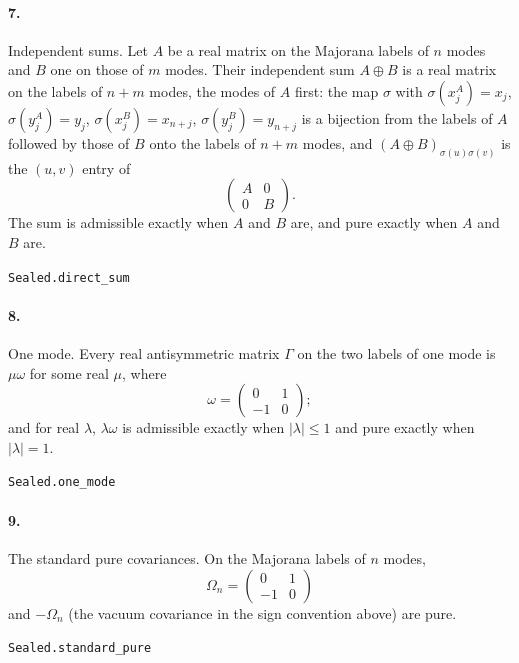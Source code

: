 \documentclass[11pt]{article}
\begin{document}
\paragraph{7.} Independent sums. Let $A$ be a real matrix on the Majorana labels of $n$ modes and $B$ one on those of $m$ modes. Their independent sum $A \oplus B$ is a real matrix on the labels of $n + m$ modes, the modes of $A$ first: the map $\sigma$ with $\sigma(x_j^A) = x_j$, $\sigma(y_j^A) = y_j$, $\sigma(x_j^B) = x_{n+j}$, $\sigma(y_j^B) = y_{n+j}$ is a bijection from the labels of $A$ followed by those of $B$ onto the labels of $n + m$ modes, and $(A \oplus B)_{\sigma(u) \sigma(v)}$ is the $(u, v)$ entry of \[\begin{pmatrix} A & 0 \\ 0 & B \end{pmatrix}.\] The sum is admissible exactly when $A$ and $B$ are, and pure exactly when $A$ and $B$ are.\par{\footnotesize\texttt{Sealed.direct\_sum}}

\paragraph{8.} One mode. Every real antisymmetric matrix $\Gamma$ on the two labels of one mode is $\mu \omega$ for some real $\mu$, where \[\omega = \begin{pmatrix} 0 & 1 \\ -1 & 0 \end{pmatrix};\] and for real $\lambda$, $\lambda \omega$ is admissible exactly when $|\lambda| \le 1$ and pure exactly when $|\lambda| = 1$.\par{\footnotesize\texttt{Sealed.one\_mode}}

\paragraph{9.} The standard pure covariances. On the Majorana labels of $n$ modes, \[\Omega_n = \begin{pmatrix} 0 & 1 \\ -1 & 0 \end{pmatrix}\] and $-\Omega_n$ (the vacuum covariance in the sign convention above) are pure.\par{\footnotesize\texttt{Sealed.standard\_pure}}
\end{document}
